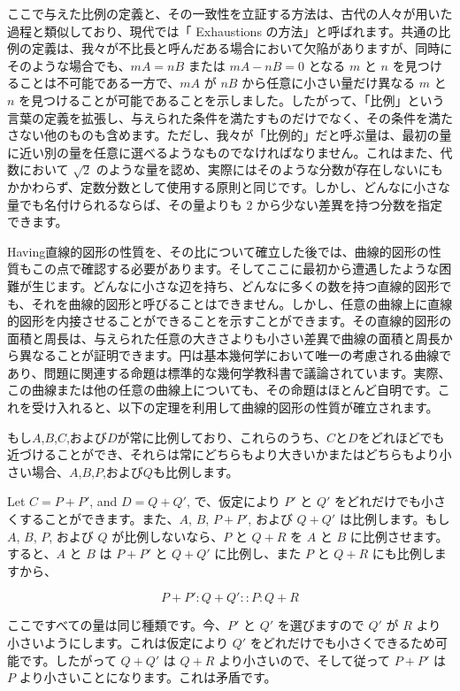 \documentclass[a4paper,11pt,openany]{ltjsbook}
\begin{document}
ここで与えた比例の定義と、その一致性を立証する方法は、古代の人々が用いた過程と類似しており、現代では「 Exhaustions の方法」と呼ばれます。共通の比例の定義は、我々が不比長と呼んだある場合において欠陥がありますが、同時にそのような場合でも、$mA = nB$ または $mA - nB = 0$ となる $m$ と $n$ を見つけることは不可能である一方で、$mA$ が $nB$ から任意に小さい量だけ異なる $m$ と $n$ を見つけることが可能であることを示しました。したがって、「比例」という言葉の定義を拡張し、与えられた条件を満たすものだけでなく、その条件を満たさない他のものも含めます。ただし、我々が「比例的」だと呼ぶ量は、最初の量に近い別の量を任意に選べるようなものでなければなりません。これはまた、代数において $\sqrt{2}$ のような量を認め、実際にはそのような分数が存在しないにもかかわらず、定数分数として使用する原則と同じです。しかし、どんなに小さな量でも名付けられるならば、その量よりも $2$ から少ない差異を持つ分数を指定できます。

Having直線的図形の性質を、その比について確立した後では、曲線的図形の性質もこの点で確認する必要があります。そしてここに最初から遭遇したような困難が生じます。どんなに小さな辺を持ち、どんなに多くの数を持つ直線的図形でも、それを曲線的図形と呼びることはできません。しかし、任意の曲線上に直線的図形を内接させることができることを示すことができます。その直線的図形の面積と周長は、与えられた任意の大きさよりも小さい差異で曲線の面積と周長から異なることが証明できます。円は基本幾何学において唯一の考慮される曲線であり、問題に関連する命題は標準的な幾何学教科書で議論されています。実際、この曲線または他の任意の曲線上についても、その命題はほとんど自明です。これを受け入れると、以下の定理を利用して曲線的図形の性質が確立されます。

もし$A$,$B$,$C$,および$D$が常に比例しており、これらのうち、$C$と$D$をどれほどでも近づけることができ、それらは常にどちらもより大きいかまたはどちらもより小さい場合、$A$,$B$,$P$,および$Q$も比例します。

Let \( C = P + P' \), and \( D = Q + Q' \), で、仮定により \( P' \) と \( Q' \) をどれだけでも小さくすることができます。また、\( A \), \( B \), \( P + P' \), および \( Q + Q' \) は比例します。もし \( A \), \( B \), \( P \), および \( Q \) が比例しないなら、\( P \) と \( Q + R \) を \( A \) と \( B \) に比例させます。すると、\( A \) と \( B \) は \( P + P' \) と \( Q + Q' \) に比例し、また \( P \) と \( Q + R \) にも比例しますから、

\[
P + P' : Q + Q' :: P : Q + R
\]

ここですべての量は同じ種類です。今、\( P' \) と \( Q' \) を選びますので \( Q' \) が \( R \) より小さいようにします。これは仮定により \( Q' \) をどれだけでも小さくできるため可能です。したがって \( Q + Q' \) は \( Q + R \) より小さいので、そして従って \( P + P' \) は \( P \) より小さいことになります。これは矛盾です。
\end{document}

